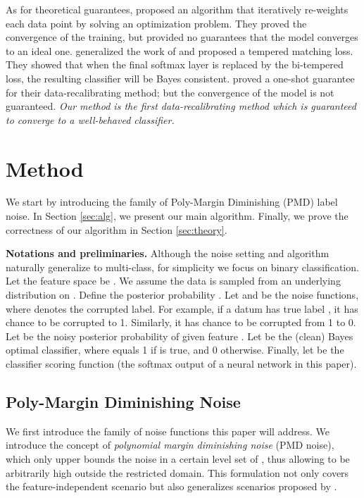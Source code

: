 \documentclass{article} \usepackage{iclr2021_conference,times}
\begin{document}
As for theoretical guarantees,
\cite{Ren_Reweight_ICML2018} proposed an algorithm that iteratively re-weights each data point by solving an optimization problem. They proved the convergence of the training, but provided no guarantees that the model converges to an ideal one. \cite{BregmanDiv_2019_NIPS} generalized the work of \citep{TsallisDiv_2019_PMLR} and proposed a tempered matching loss. They showed that when the final softmax layer is replaced by the bi-tempered loss, the resulting classifier will be Bayes consistent. 
\cite{songzhu_2020_ICML} proved a one-shot guarantee for their data-recalibrating method; but the convergence of the model is not guaranteed. 
\emph{Our method is the first data-recalibrating method which is guaranteed to converge to a well-behaved classifier.}

\section{Method}

We start by introducing the family of Poly-Margin Diminishing (PMD) label noise. In Section \ref{sec:alg}, we present our main algorithm. Finally, we prove the correctness of our algorithm in Section \ref{sec:theory}.

\newcommand{\calX}{\mathcal{X}}

\textbf{Notations and preliminaries.} 
Although the noise setting and algorithm naturally generalize to multi-class, for simplicity we focus on binary classification.
Let the feature space be .
We assume the data  is sampled from an underlying distribution  on . Define the posterior probability . Let  and  be the noise functions, where  denotes the corrupted label. For example, if a datum  has true label , it has  chance to be corrupted to 1. Similarly, it has  chance to be corrupted from 1 to 0. Let  be the noisy posterior probability of  given feature .  Let  be the (clean) Bayes optimal classifier, where  equals 1 if  is true, and 0 otherwise. Finally, let  be the classifier scoring function (the softmax output of a neural network in this paper). 

\subsection{Poly-Margin Diminishing Noise}
\label{sec:noise}

We first introduce the family of noise functions  this paper will address. We introduce the concept of \emph{polynomial margin diminishing noise} (PMD noise), which only upper bounds the noise  in a certain level set of , thus allowing  to be arbitrarily high outside the restricted domain. This formulation not only covers the feature-independent scenario but also generalizes scenarios proposed by \citep{du_BCN_2015_AAAI,  Aditya_Binary_Instance_2018_MachLearn,jiacheng_BoundedInstance_2020_ICML}.
\end{document}

